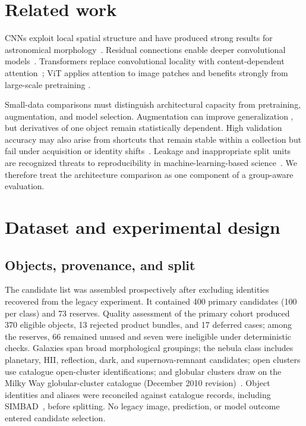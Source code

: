 \documentclass[preprint,12pt,authoryear]{elsarticle}
\begin{document}
\section{Related work}

CNNs exploit local spatial structure and have produced strong results for
astronomical morphology~\cite{dieleman2015,huertas2018}. Residual connections enable
deeper convolutional models~\cite{he2016deep}. Transformers replace convolutional
locality with content-dependent attention~\cite{vaswani2017}; ViT applies attention
to image patches and benefits strongly from large-scale pretraining
\cite{dosovitskiy2020,khan2021}.

Small-data comparisons must distinguish architectural capacity from pretraining,
augmentation, and model selection. Augmentation can improve generalization
\cite{shorten2019}, but derivatives of one object remain statistically dependent.
High validation accuracy may also arise from shortcuts that remain stable within a
collection but fail under acquisition or identity shifts~\cite{geirhos2020shortcut}.
Leakage and inappropriate split units are recognized threats to reproducibility in
machine-learning-based science~\cite{kapoor2023leakage}. We therefore treat the
architecture comparison as one component of a group-aware evaluation.

\section{Dataset and experimental design}

\subsection{Objects, provenance, and split}

The candidate list was assembled prospectively after excluding identities recovered
from the legacy experiment. It contained 400 primary candidates (100 per class) and
73 reserves. Quality assessment of the primary cohort produced 370 eligible objects,
13 rejected product bundles, and 17 deferred cases; among the reserves, 66 remained
unused and seven were ineligible under deterministic checks. Galaxies span broad
morphological groupings; the nebula class includes planetary, HII, reflection,
dark, and supernova-remnant candidates; open clusters use catalogue open-cluster
identifications; and globular clusters draw on the Milky Way globular-cluster
catalogue (December 2010 revision)~\cite{harris1996}. Object identities and aliases
were reconciled against catalogue records,
including SIMBAD~\cite{wenger2000simbad}, before splitting. No legacy image,
prediction, or model outcome entered candidate selection.
\end{document}
